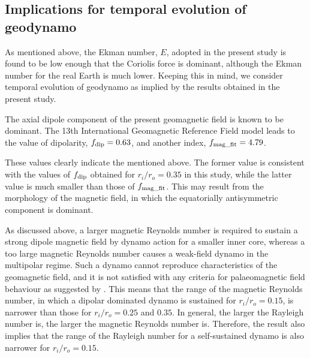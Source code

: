 \subsection{Implications for temporal evolution of geodynamo}

As mentioned above, the Ekman number, $E$, adopted in the present study is found to be low enough that the Coriolis force is dominant, although the Ekman number for the real Earth is much lower.
Keeping this in mind, we consider temporal evolution of geodynamo as implied by the results obtained in the present study.

The axial dipole component of the present geomagnetic field is known to be dominant.
The 13th International Geomagnetic Reference Field model \citep{Alken:2021} leads to the value of dipolarity, $f_{\rm dip} = 0.63$, and another index, $f_{\rm mag\_fit} = 4.79$.

These values clearly indicate the mentioned above.
The former value is consistent with the values of $f_{\rm dip}$ obtained for $r_i / r_o = 0.35$ in this study, while the latter value is much smaller than those of $f_{\rm mag\_fit}$.
This may result from the morphology of the magnetic field, in which the equatorially antisymmetric component is dominant.


As discussed above, a larger magnetic Reynolds number is required to sustain a strong dipole magnetic field by dynamo action for a smaller inner core, whereas a too large magnetic Reynolds number causes a weak-field dynamo in the multipolar regime.
Such a dynamo cannot reproduce characteristics of the geomagnetic field, and it is not satisfied with any criteria for palaeomagnetic field behaviour as suggested by \citet{Sprain:2019}.
This means that the range of the magnetic Reynolds number, in which a dipolar dominated dynamo is sustained for $r_i / r_o = 0.15$, is narrower than those for $r_i / r_o = 0.25$ and $0.35$.
In general, the larger the Rayleigh number is, the larger the magnetic Reynolds number is.
Therefore, the result also implies that the range of the Rayleigh number for a self-sustained dynamo is also narrower for $r_i / r_o = 0.15$.

